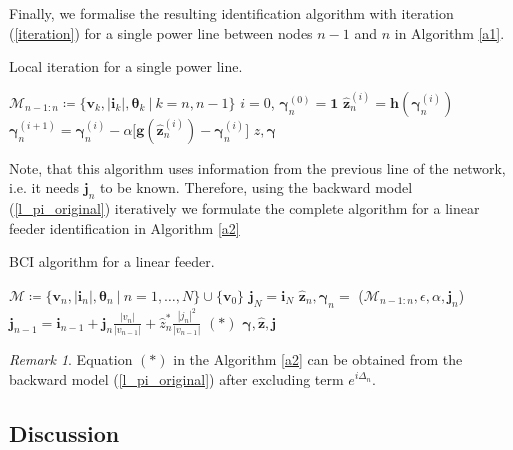 \documentclass[journal,10pt,onecolumn,draftclsnofoot,]{IEEEtran}
\theoremstyle{plain}
\theoremstyle{definition}
\theoremstyle{remark}
\newtheorem*{remark}{Remark}
\begin{document}
Finally, we formalise the resulting identification algorithm with iteration (\ref{iteration}) for a single power line between nodes $n-1$ and $n$  in Algorithm \ref{a1}. 
\begin{algorithm}[ht]
\caption{Local iteration for a single power line.
}
\label{a1}
\begin{algorithmic}[1]
\State $\mathcal{M}_{n-1:n} \coloneqq \{\bm{v}_{k}, |\bm{i}_{k}|, \bm{\theta}_{k} ~\big|~ k=n, n-1 \}$
\State $i = 0$, $\bm{\gamma}_{n}^{(0)} = \mathbf{1}$
\Do 
\State $\widehat{\bm{z}}_n^{(i)} = \bm{h}(\bm{\gamma}_{n}^{(i)})$
\State $\bm{\gamma}_{n}^{(i+1)} = \bm{\gamma}_{n}^{(i)} - \alpha\Big[\bm{g}(\widehat{\bm{z}}_n^{(i)}) - \bm{\gamma}_{n}^{(i)}\Big]$
\State \Return $\widehat{z}, \bm{\gamma}$
\EndFunction
\end{algorithmic}
\end{algorithm} 
Note, that this algorithm uses information from the previous line of the network, i.e. it needs $\bm{j}_n$ to be known. Therefore, using the backward model (\ref{l_pi_original}) iteratively we formulate the complete algorithm for a linear feeder identification in Algorithm \ref{a2}
\begin{algorithm}[H]
\caption{BCI algorithm for a linear feeder.}
\label{a2}
\begin{algorithmic}[1]
\State $\mathcal{M} \coloneqq \{\bm{v}_{n}, |\bm{i}_{n}|, \bm{\theta}_{n} ~\big|~ n=1, \ldots, N \} \cup \{ \bm{v}_0 \}$
\State $\bm{j}_{N} = \bm{i}_{N}$
\State $\widehat{\bm{z}}_n, \bm{\gamma}_n = $ ($\mathcal{M}_{n-1:n}, \epsilon, \alpha, \bm{j}_n$)
\State $\bm{j}_{n-1} = \bm{i}_{n-1} + \bm{j}_{n}\frac{|v_{n}|}{|v_{n-1}|} + \widehat{z}_n^*\frac{|j_{n}|^2}{|v_{n-1}|}$ 
\Comment $(\ast)$ 
\EndFor
\State \Return $\bm{\gamma}, \widehat{\bm{z}}, \bm{j}$
\EndFunction
\end{algorithmic}
\end{algorithm} 
\begin{remark}
Equation $(\ast)$ in the Algorithm \ref{a2} can be obtained from the backward model (\ref{l_pi_original}) after excluding term $e^{i\Delta_n}$. 
\end{remark}


\subsection{Discussion}
\end{document}
